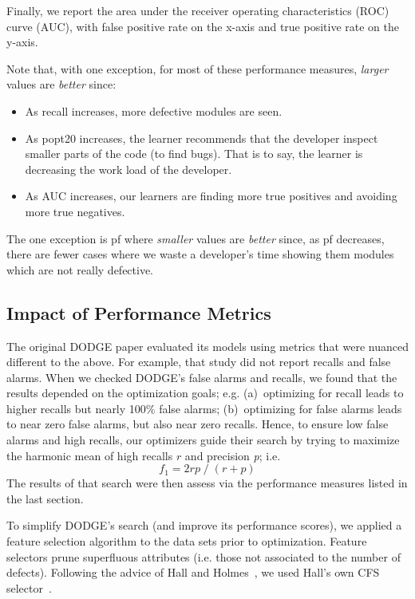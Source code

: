 \documentclass[10pt,compsoc,twocolumn]{IEEEtran}
\begin{document}
Finally, we report the area under the receiver operating characteristics (ROC) curve (AUC), with false positive rate on the x-axis and true positive rate on the y-axis.

Note
that, with one exception,  for most of these performance measures, {\em larger} values are {\em better} since:
\begin{itemize}
\item
As  recall increases,
  more defective modules are seen.   

 \item
 As  popt20 increases, the  learner recommends that the developer inspect  smaller parts of the code (to find bugs).
 That is to say, the learner is decreasing the work load of the developer.   
  \item
  As  AUC increases, our learners  are finding more true positives and avoiding more true negatives.

\end{itemize}
The one exception is pf where {\em smaller} values are {\em better} since,
 as   pf decreases,
there are fewer cases where we waste a developer's time showing them modules which are not really defective. 

\subsection{Impact of Performance Metrics}
The original DODGE paper evaluated its models using metrics that were nuanced different to the above.
For example,
that study did not report recalls and false alarms.
When  we checked DODGE's false alarms and recalls, we found that the results depended on the optimization goals; e.g. (a)~optimizing 
 for recall  leads to higher  recalls but nearly 100\% false alarms;
(b)~optimizing  for false alarms  leads to near zero false alarms, but also near zero recalls. Hence, 
to ensure low false alarms and high recalls, our optimizers guide their search by trying to maximize the harmonic mean of high recalls $r$ and precision {\em p}; i.e. 
\[ f_1 = 2rp\;/\;(r+p)\]The results of that search were then assess via the performance measures listed in the last section.

To simplify DODGE's search (and improve its performance scores), we applied a feature selection algorithm to the data sets prior to optimization. Feature selectors
prune superfluous attributes (i.e. those not associated to the number of defects).
Following the advice of Hall and Holmes~\cite{holmes03}, we used Hall's own  CFS    selector~\cite{hall00}.
\end{document}
